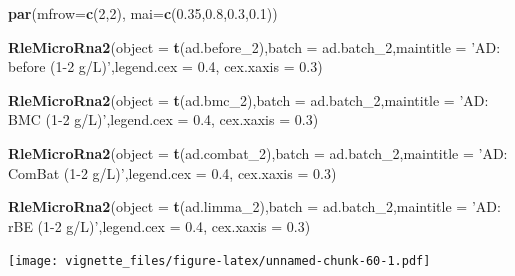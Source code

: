 \documentclass[]{book}
\newenvironment{Shaded}{\begin{snugshade}}{\end{snugshade}}
\newcommand{\KeywordTok}[1]{\textcolor[rgb]{0.13,0.29,0.53}{\textbf{#1}}}
\newcommand{\DataTypeTok}[1]{\textcolor[rgb]{0.13,0.29,0.53}{#1}}
\newcommand{\DecValTok}[1]{\textcolor[rgb]{0.00,0.00,0.81}{#1}}
\newcommand{\FloatTok}[1]{\textcolor[rgb]{0.00,0.00,0.81}{#1}}
\newcommand{\StringTok}[1]{\textcolor[rgb]{0.31,0.60,0.02}{#1}}
\newcommand{\NormalTok}[1]{#1}
\begin{document}
\begin{Shaded}
\begin{Highlighting}[]
\KeywordTok{par}\NormalTok{(}\DataTypeTok{mfrow=}\KeywordTok{c}\NormalTok{(}\DecValTok{2}\NormalTok{,}\DecValTok{2}\NormalTok{), }\DataTypeTok{mai=}\KeywordTok{c}\NormalTok{(}\FloatTok{0.35}\NormalTok{,}\FloatTok{0.8}\NormalTok{,}\FloatTok{0.3}\NormalTok{,}\FloatTok{0.1}\NormalTok{))}

\KeywordTok{RleMicroRna2}\NormalTok{(}\DataTypeTok{object =} \KeywordTok{t}\NormalTok{(ad.before_}\DecValTok{2}\NormalTok{),}\DataTypeTok{batch =}\NormalTok{ ad.batch_}\DecValTok{2}\NormalTok{,}\DataTypeTok{maintitle =} \StringTok{'AD: before (1-2 g/L)'}\NormalTok{,}\DataTypeTok{legend.cex =} \FloatTok{0.4}\NormalTok{, }\DataTypeTok{cex.xaxis =} \FloatTok{0.3}\NormalTok{)}

\KeywordTok{RleMicroRna2}\NormalTok{(}\DataTypeTok{object =} \KeywordTok{t}\NormalTok{(ad.bmc_}\DecValTok{2}\NormalTok{),}\DataTypeTok{batch =}\NormalTok{ ad.batch_}\DecValTok{2}\NormalTok{,}\DataTypeTok{maintitle =} \StringTok{'AD: BMC (1-2 g/L)'}\NormalTok{,}\DataTypeTok{legend.cex =} \FloatTok{0.4}\NormalTok{, }\DataTypeTok{cex.xaxis =} \FloatTok{0.3}\NormalTok{)}

\KeywordTok{RleMicroRna2}\NormalTok{(}\DataTypeTok{object =} \KeywordTok{t}\NormalTok{(ad.combat_}\DecValTok{2}\NormalTok{),}\DataTypeTok{batch =}\NormalTok{ ad.batch_}\DecValTok{2}\NormalTok{,}\DataTypeTok{maintitle =} \StringTok{'AD: ComBat (1-2 g/L)'}\NormalTok{,}\DataTypeTok{legend.cex =} \FloatTok{0.4}\NormalTok{, }\DataTypeTok{cex.xaxis =} \FloatTok{0.3}\NormalTok{)}

\KeywordTok{RleMicroRna2}\NormalTok{(}\DataTypeTok{object =} \KeywordTok{t}\NormalTok{(ad.limma_}\DecValTok{2}\NormalTok{),}\DataTypeTok{batch =}\NormalTok{ ad.batch_}\DecValTok{2}\NormalTok{,}\DataTypeTok{maintitle =} \StringTok{'AD: rBE (1-2 g/L)'}\NormalTok{,}\DataTypeTok{legend.cex =} \FloatTok{0.4}\NormalTok{, }\DataTypeTok{cex.xaxis =} \FloatTok{0.3}\NormalTok{)}
\end{Highlighting}
\end{Shaded}

\texttt{[image: vignette\_files/figure-latex/unnamed-chunk-60-1.pdf]}
\end{document}
